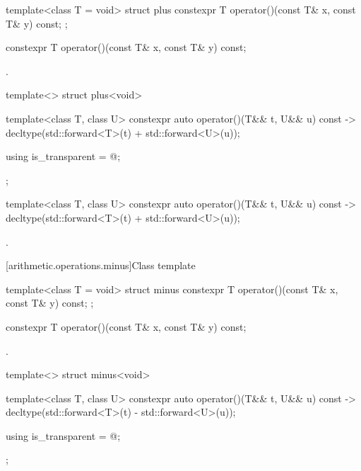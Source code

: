 %
\begin{itemdecl}
template<class T = void> struct plus {
  constexpr T operator()(const T& x, const T& y) const;
};
\end{itemdecl}

%
\begin{itemdecl}
constexpr T operator()(const T& x, const T& y) const;
\end{itemdecl}

\begin{itemdescr}
\pnum
\returns
{}.
\end{itemdescr}

%
\begin{itemdecl}
template<> struct plus<void> {
  template<class T, class U> constexpr auto operator()(T&& t, U&& u) const
    -> decltype(std::forward<T>(t) + std::forward<U>(u));

  using is_transparent = @\unspec@;
};
\end{itemdecl}

%
\begin{itemdecl}
template<class T, class U> constexpr auto operator()(T&& t, U&& u) const
    -> decltype(std::forward<T>(t) + std::forward<U>(u));
\end{itemdecl}

\begin{itemdescr}
\pnum
\returns
{}.
\end{itemdescr}

[arithmetic.operations.minus]{Class template }

%
\begin{itemdecl}
template<class T = void> struct minus {
  constexpr T operator()(const T& x, const T& y) const;
};
\end{itemdecl}

%
\begin{itemdecl}
constexpr T operator()(const T& x, const T& y) const;
\end{itemdecl}

\begin{itemdescr}
\pnum
\returns
{}.
\end{itemdescr}

%
\begin{itemdecl}
template<> struct minus<void> {
  template<class T, class U> constexpr auto operator()(T&& t, U&& u) const
    -> decltype(std::forward<T>(t) - std::forward<U>(u));

  using is_transparent = @\unspec@;
};
\end{itemdecl}

